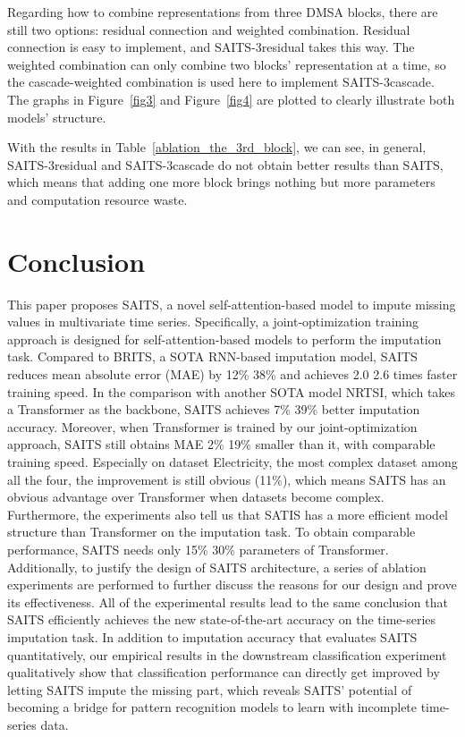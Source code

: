 \documentclass{article}
\begin{document}
Regarding how to combine representations from three DMSA blocks, there are still two options: residual connection and weighted combination. Residual connection is easy to implement, and SAITS-3residual takes this way. The weighted combination can only combine two blocks' representation at a time, so the cascade-weighted combination is used here to implement SAITS-3cascade. The graphs in Figure~\ref{fig3} and Figure~\ref{fig4} are plotted to clearly illustrate both models' structure.

With the results in Table~\ref{ablation_the_3rd_block}, we can see, in general, SAITS-3residual and SAITS-3cascade do not obtain better results than SAITS, which means that adding one more block brings nothing but more parameters and computation resource waste.

\section{Conclusion} \label{conclusion}
This paper proposes SAITS, a novel self-attention-based model to impute missing values in multivariate time series. Specifically, a joint-optimization training approach is designed for self-attention-based models to perform the imputation task. Compared to BRITS, a SOTA RNN-based imputation model, SAITS reduces mean absolute error (MAE) by 12\%  38\% and achieves 2.0  2.6 times faster training speed. In the comparison with another SOTA model NRTSI, which takes a Transformer as the backbone, SAITS achieves 7\%  39\% better imputation accuracy. Moreover, when Transformer is trained by our joint-optimization approach, SAITS still obtains MAE 2\%  19\% smaller than it, with comparable training speed. Especially on dataset Electricity, the most complex dataset among all the four, the improvement is still obvious (11\%), which means SAITS has an obvious advantage over Transformer when datasets become complex. Furthermore, the experiments also tell us that SATIS has a more efficient model structure than Transformer on the imputation task. To obtain comparable performance, SAITS needs only 15\%  30\% parameters of Transformer. Additionally, to justify the design of SAITS architecture, a series of ablation experiments are performed to further discuss the reasons for our design and prove its effectiveness. All of the experimental results lead to the same conclusion that SAITS efficiently achieves the new state-of-the-art accuracy on the time-series imputation task. In addition to imputation accuracy that evaluates SAITS quantitatively, our empirical results in the downstream classification experiment qualitatively show that classification performance can directly get improved by letting SAITS impute the missing part, which reveals SAITS' potential of becoming a bridge for pattern recognition models to learn with incomplete time-series data.
\end{document}
